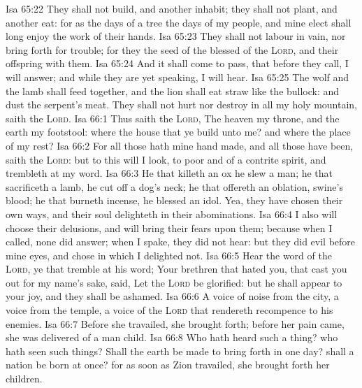 \vs Isa 65:22 They shall not build, and another inhabit; they shall not plant, and another eat: for as the days of a tree  the days of my people, and mine elect shall long enjoy the work of their hands.
\vs Isa 65:23 They shall not labour in vain, nor bring forth for trouble; for they  the seed of the blessed of the \textsc{Lord}, and their offspring with them.
\vs Isa 65:24 And it shall come to pass, that before they call, I will answer; and while they are yet speaking, I will hear.
\vs Isa 65:25 The wolf and the lamb shall feed together, and the lion shall eat straw like the bullock: and dust  the serpent's meat. They shall not hurt nor destroy in all my holy mountain, saith the \textsc{Lord}.
\vs Isa 66:1 Thus saith the \textsc{Lord}, The heaven  my throne, and the earth  my footstool: where  the house that ye build unto me? and where  the place of my rest?
\vs Isa 66:2 For all those  hath mine hand made, and all those  have been, saith the \textsc{Lord}: but to this  will I look,  to  poor and of a contrite spirit, and trembleth at my word.
\vs Isa 66:3 He that killeth an ox  he slew a man; he that sacrificeth a lamb,  he cut off a dog's neck; he that offereth an oblation,  swine's blood; he that burneth incense,  he blessed an idol. Yea, they have chosen their own ways, and their soul delighteth in their abominations.
\vs Isa 66:4 I also will choose their delusions, and will bring their fears upon them; because when I called, none did answer; when I spake, they did not hear: but they did evil before mine eyes, and chose  in which I delighted not.
\vs Isa 66:5 Hear the word of the \textsc{Lord}, ye that tremble at his word; Your brethren that hated you, that cast you out for my name's sake, said, Let the \textsc{Lord} be glorified: but he shall appear to your joy, and they shall be ashamed.
\vs Isa 66:6 A voice of noise from the city, a voice from the temple, a voice of the \textsc{Lord} that rendereth recompence to his enemies.
\vs Isa 66:7 Before she travailed, she brought forth; before her pain came, she was delivered of a man child.
\vs Isa 66:8 Who hath heard such a thing? who hath seen such things? Shall the earth be made to bring forth in one day?  shall a nation be born at once? for as soon as Zion travailed, she brought forth her children.
